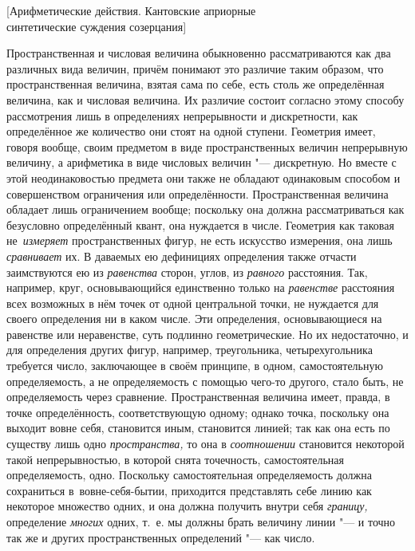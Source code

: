 %
{[Арифметические действия. Кантовские априорные\\
синтетические суждения созерцания]}

Пространственная и числовая величина обыкновенно рассматриваются как два
различных вида величин, причём понимают это различие таким образом, что
пространственная величина, взятая сама по себе, есть столь же определённая
величина, как и числовая величина. Их различие состоит согласно этому способу
рассмотрения лишь в определениях непрерывности и дискретности, как определённое
же количество они стоят на одной ступени. Геометрия имеет, говоря вообще, своим
предметом в виде пространственных величин непрерывную величину, а арифметика в
виде числовых величин "--- дискретную. Но вместе с этой неодинаковостью
предмета они также не обладают одинаковым способом и совершенством ограничения
или определённости. Пространственная величина обладает лишь ограничением
вообще; поскольку она должна рассматриваться как безусловно определённый
квант, она нуждается в числе. Геометрия как таковая не~{\em измеряет}
пространственных фигур, не есть искусство измерения, она лишь {\em сравнивает}
их. В даваемых ею дефинициях определения также отчасти заимствуются ею из
{\em равенства} сторон, углов, из {\em равного} расстояния. Так, например,
круг, основывающийся единственно только на {\em равенстве} расстояния всех
возможных в нём точек от одной центральной точки, не нуждается для своего
определения ни в каком числе. Эти определения, основывающиеся на равенстве или
неравенстве, суть подлинно геометрические. Но их недостаточно, и для
определения других фигур, например, треугольника, четырехугольника требуется
число, заключающее в своём принципе, в одном, самостоятельную определяемость,
а не определяемость с помощью чего-то другого, стало быть, не определяемость
через сравнение. Пространственная величина имеет, правда, в точке
определённость, соответствующую одному; однако точка, поскольку она выходит вовне
себя, становится иным, становится линией; так как она есть по существу
лишь одно {\em пространства,} то она в {\em соотношении} становится некоторой
такой непрерывностью, в которой снята точечность, самостоятельная
определяемость, одно. Поскольку самостоятельная определяемость должна
сохраниться в~вовне-себя-бытии, приходится представлять себе линию как некоторое
множество одних, и она должна получить внутри себя {\em границу,} определение
{\em многих} одних, т.~е. мы должны брать величину линии "--- и точно так же и
других пространственных определений "--- как число.

